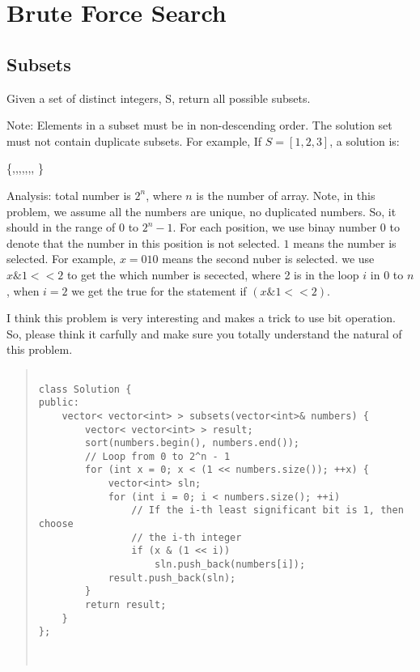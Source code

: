 \chapter{Brute Force Search}\label{chp:BruteForce}

\section{Subsets}


Given a set of distinct integers, S, return all possible subsets.

Note:
Elements in a subset must be in non-descending order.
The solution set must not contain duplicate subsets.
For example,
If $S = [1,2,3]$, a solution is:

\newline
\{\newline
  [3],\newline
  [1],\newline
  [2],\newline
  [1,2,3],\newline
  [1,3],\newline
  [2,3],\newline
  [1,2],\newline
  [ ]\newline
\}\newline




Analysis: total number is $2^n$, where $n$ is the number of array.
Note, in this problem, we assume all the numbers are unique, no duplicated numbers.
So, it should in the range of $0$ to $2^n-1$.
For each position, we use binay number $0$ to denote that the number in this position is not selected. $1$ means the number is selected.
For example, $x= 0 1 0$ means the second nuber is selected. we use $x \& 1<<2$ to get the which number is secected, where 2 is in the loop $i$ in 0 to $n$, when $i=2$ we get the true for the statement if $ (x \& 1<<2)$.

I think this problem is very interesting and makes a trick to use bit operation. So, please think it carfully and make sure you totally understand the natural of this problem.

\begin{quote}
\begin{verbatim}

class Solution {
public:
    vector< vector<int> > subsets(vector<int>& numbers) {
        vector< vector<int> > result;
        sort(numbers.begin(), numbers.end());
        // Loop from 0 to 2^n - 1
        for (int x = 0; x < (1 << numbers.size()); ++x) {
            vector<int> sln;
            for (int i = 0; i < numbers.size(); ++i)
                // If the i-th least significant bit is 1, then choose
                // the i-th integer
                if (x & (1 << i))
                    sln.push_back(numbers[i]);
            result.push_back(sln);
        }
        return result;
    }
};



\end{verbatim}
\end{quote}
